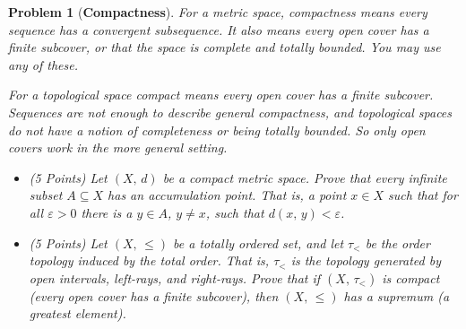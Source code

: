 \documentclass{article}
\theoremstyle{normal}
\newtheorem{problem}{Problem}
\begin{document}
    \begin{problem}[\textbf{Compactness}]
        \par\hfill\par
        For a metric space, compactness means every sequence has a convergent
        subsequence. It also means every open cover has a finite subcover, or
        that the space is complete and totally bounded. You may use any of
        these.
        \par\hfill\par
        For a topological space compact means every open cover has a finite
        subcover. Sequences are not enough to describe general compactness, and
        topological spaces do not have a notion of completeness or being
        totally bounded. So only open covers work in the more general setting.
        \begin{itemize}
            \item (5 Points) Let $(X,\,d)$ be a compact metric space. Prove
                that every infinite subset $A\subseteq{X}$ has an accumulation
                point. That is, a point $x\in{X}$ such that for all
                $\varepsilon>0$ there is a $y\in{A}$, $y\ne{x}$, such that
                $d(x,\,y)<\varepsilon$.
            \item (5 Points) Let $(X,\,\leq)$ be a totally ordered set, and let
                $\tau_{<}$ be the order topology induced by the total order.
                That is, $\tau_{<}$ is the topology generated by open intervals,
                left-rays, and right-rays. Prove that if $(X,\,\tau_{<})$ is
                compact (every open cover has a finite subcover), then
                $(X,\,\leq)$ has a supremum (a greatest element).
        \end{itemize}
    \end{problem}
    \color{black}
\end{document}
